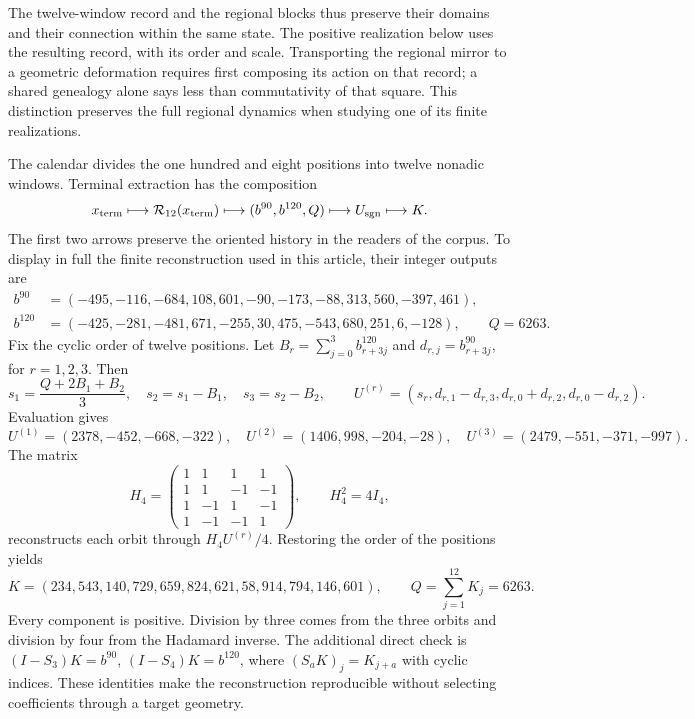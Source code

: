 \documentclass[a4paper,10pt]{article}
\theoremstyle{definition}\newtheorem{definition}[theorem]{Definition}
\theoremstyle{remark}\newtheorem{remark}[theorem]{Remark}
\numberwithin{equation}{section}
\begin{document}
The twelve-window record and the regional blocks thus preserve
their domains and their connection within the same state. The positive realization
below uses the resulting record, with its order and scale.
Transporting the regional mirror to a geometric deformation requires
first composing its action on that record; a shared genealogy
alone says less than commutativity of that square. This
distinction preserves the full regional dynamics when studying
one of its finite realizations.

The calendar divides the one hundred and eight positions into twelve nonadic windows.
Terminal extraction has the composition
\[
 x_{\rm term}\longmapsto\mathcal R_{12}(x_{\rm term})
 \longmapsto(b^{90},b^{120},Q)\longmapsto U_{\rm sgn}\longmapsto K.
\]
The first two arrows preserve the oriented history in the readers
of the corpus. To display in full the finite reconstruction used
in this article, their integer outputs are
\begin{align*}
 b^{90}&=(-495,-116,-684,108,601,-90,-173,-88,313,560,-397,461),\\
 b^{120}&=(-425,-281,-481,671,-255,30,475,-543,680,251,6,-128),
 \qquad Q=6263.
\end{align*}
Fix the cyclic order of twelve positions. Let
\(B_r=\sum_{j=0}^3 b^{120}_{r+3j}\) and
\(d_{r,j}=b^{90}_{r+3j}\), for \(r=1,2,3\). Then
\[
 s_1=\frac{Q+2B_1+B_2}{3},\quad s_2=s_1-B_1,\quad s_3=s_2-B_2,
 \qquad
 U^{(r)}=(s_r,d_{r,1}-d_{r,3},d_{r,0}+d_{r,2},d_{r,0}-d_{r,2}).
\]
Evaluation gives
\[
 U^{(1)}=(2378,-452,-668,-322),\quad
 U^{(2)}=(1406,998,-204,-28),\quad
 U^{(3)}=(2479,-551,-371,-997).
\]
The matrix
\[
 H_4=\begin{pmatrix}1&1&1&1\\1&1&-1&-1\\1&-1&1&-1\\1&-1&-1&1\end{pmatrix},
 \qquad H_4^2=4I_4,
\]
reconstructs each orbit through \(H_4U^{(r)}/4\). Restoring the order
of the positions yields
\begin{equation}
 K=(234,543,140,729,659,824,621,58,914,794,146,601),
 \qquad Q=\sum_{j=1}^{12}K_j=6263.
 \label{eq:K-main}
\end{equation}
Every component is positive. Division by three comes from the three
orbits and division by four from the Hadamard inverse. The additional
direct check is \((I-S_3)K=b^{90}\),
\((I-S_4)K=b^{120}\), where \((S_aK)_j=K_{j+a}\) with cyclic indices.
These identities make the reconstruction reproducible without selecting
coefficients through a target geometry.
\end{document}
